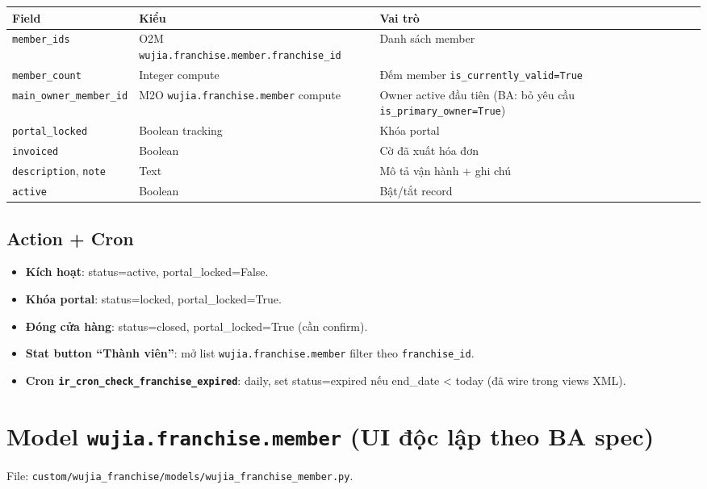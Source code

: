 \begin{longtable}{p{5cm} p{4cm} p{6cm}}
\toprule
\textbf{Field} & \textbf{Kiểu} & \textbf{Vai trò} \\
\midrule
\endhead
\texttt{member\_ids} & O2M \texttt{wujia.franchise.member.franchise\_id} & Danh sách member \\
\texttt{member\_count} & Integer compute & Đếm member \texttt{is\_currently\_valid=True} \\
\texttt{main\_owner\_member\_id} & M2O \texttt{wujia.franchise.member} compute & Owner active đầu tiên (BA: bỏ yêu cầu \texttt{is\_primary\_owner=True}) \\
\texttt{portal\_locked} & Boolean tracking & Khóa portal \\
\texttt{invoiced} & Boolean & Cờ đã xuất hóa đơn \\
\texttt{description}, \texttt{note} & Text & Mô tả vận hành + ghi chú \\
\texttt{active} & Boolean & Bật/tắt record \\
\bottomrule
\end{longtable}

\subsection{Action + Cron}

\begin{itemize}
    \item \textbf{Kích hoạt}: status=active, portal\_locked=False.
    \item \textbf{Khóa portal}: status=locked, portal\_locked=True.
    \item \textbf{Đóng cửa hàng}: status=closed, portal\_locked=True (cần confirm).
    \item \textbf{Stat button ``Thành viên''}: mở list \texttt{wujia.franchise.member} filter theo \texttt{franchise\_id}.
    \item \textbf{Cron \texttt{ir\_cron\_check\_franchise\_expired}}: daily, set status=expired nếu end\_date < today (đã wire trong views XML).
\end{itemize}

\section{Model \texttt{wujia.franchise.member} (UI độc lập theo BA spec)}

File: \texttt{custom/wujia\_franchise/models/wujia\_franchise\_member.py}.

